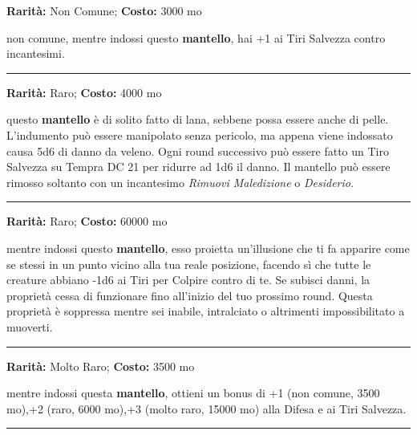 \begin{multicols}{2}
\textbf{Rarità:} Non Comune; \textbf{Costo:} 3000 mo

non comune, mentre indossi questo \textbf{mantello}, hai +1 ai Tiri Salvezza contro incantesimi.

\smallskip\noindent\rule{\linewidth}{2pt}  \hypertarget{Mantellodellavelenosità}{}\smallskip{}\noindent\label{Mantellodellavelenosità}

\textbf{Rarità:} Raro; \textbf{Costo:} 4000 mo

questo \textbf{mantello} è di solito fatto di lana, sebbene possa essere anche di pelle. L'indumento può essere manipolato senza pericolo, ma appena viene indossato causa 5d6 di danno da veleno. Ogni round successivo può essere fatto un Tiro Salvezza su Tempra DC 21 per ridurre ad 1d6 il danno. Il mantello può essere rimosso soltanto con un incantesimo \emph{Rimuovi Maledizione} o \emph{Desiderio}.

\smallskip\noindent\rule{\linewidth}{2pt}  \hypertarget{MantellodiDistorsione}{}\smallskip{}\noindent\label{MantellodiDistorsione}

\textbf{Rarità:} Raro; \textbf{Costo:} 60000 mo

mentre indossi questo \textbf{mantello}, esso proietta un'illusione che ti fa apparire come se stessi in un punto vicino alla tua reale posizione, facendo sì che tutte le creature abbiano -1d6 ai Tiri per Colpire contro di te. Se subisci danni, la proprietà cessa di funzionare fino all'inizio del tuo prossimo round. Questa proprietà è soppressa mentre sei inabile, intralciato o altrimenti impossibilitato a muoverti.

\smallskip\noindent\rule{\linewidth}{2pt}  \hypertarget{MantellodiProtezione}{}\smallskip{}\noindent\label{MantellodiProtezione}

\textbf{Rarità:} Molto Raro; \textbf{Costo:} 3500 mo

mentre indossi questa \textbf{mantello}, ottieni un bonus di +1 (non comune, 3500 mo),+2 (raro, 6000 mo),+3 (molto raro, 15000 mo) alla Difesa e ai Tiri Salvezza.

\smallskip\noindent\rule{\linewidth}{2pt}  \hypertarget{ManualedeiGolem}{}\smallskip{}\noindent\label{ManualedeiGolem}


\end{multicols}
